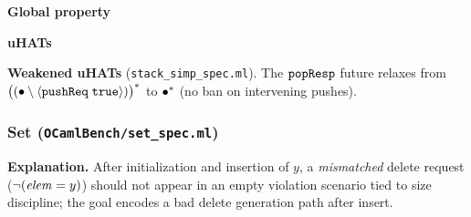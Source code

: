 \textbf{Global property}
\vspace{-.35cm}\par{}
\vspace{-.4cm}\par\nobreak\noindent
\textbf{uHATs}
\vspace{-.35cm}\par{}
\vspace{-.4cm}\par\nobreak\noindent
\textbf{Weakened uHATs} (\texttt{stack\_simp\_spec.ml}).
The \(\boldsymbol{{\tt popResp}}\) future relaxes from \({\bigl((\bullet \setminus {  {\langle} {\boldsymbol{{\tt pushReq}}\;{{\tt true}}}  {\rangle} })\bigr)^{\ast}}\) to \({\bullet^*}\) (no ban on intervening pushes).

\subsubsection*{Set (\texttt{OCamlBench/set\_spec.ml})}
\textbf{Explanation.}
After initialization and insertion of \(y\), a \emph{mismatched} delete request (\(\neg(\mathit{elem}=y)\)) should not appear in an empty violation scenario tied to size discipline; the goal encodes a bad delete generation path after insert.

